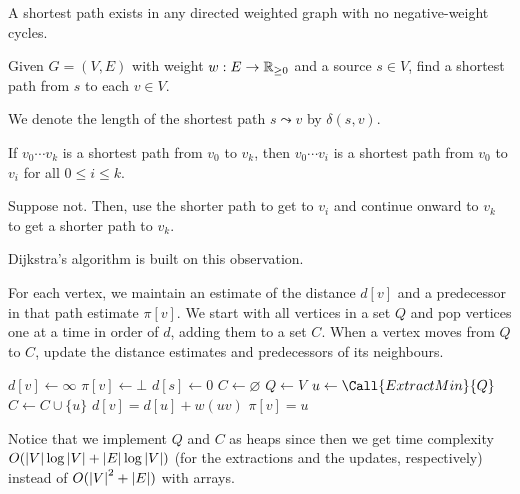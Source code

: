 \begin{remark}
  A shortest path exists in any directed weighted graph
  with no negative-weight cycles.
\end{remark}

\begin{problem}
  Given $G = (V, E)$ with weight $w : E \to \mathbb{R}_{\geq 0}$ and a source $s \in V$,
  find a shortest path from $s$ to each $v \in V$.
\end{problem}

We denote the length of the shortest path $s \leadsto v$ by $\delta(s,v)$.

\begin{remark}\label{rem:greedy:path}
  If $v_0\cdots v_k$ is a shortest path from $v_0$ to $v_k$,
  then $v_0\cdots v_i$ is a shortest path from $v_0$ to $v_i$
  for all $0 \leq i \leq k$.
\end{remark}
\begin{prf}
  Suppose not.
  Then, use the shorter path to get to $v_i$ and continue onward to $v_k$
  to get a shorter path to $v_k$.
\end{prf}

Dijkstra's algorithm is built on this observation.

For each vertex, we maintain an estimate of the distance $d[v]$
and a predecessor in that path estimate $\pi[v]$.
We start with all vertices in a set $Q$
and pop vertices one at a time in order of $d$,
adding them to a set $C$.
When a vertex moves from $Q$ to $C$,
update the distance estimates and predecessors of its neighbours.

\begin{algorithm}[H]
  \caption{}
  \begin{algorithmic}[1]
    \State $d[v] \gets \infty$
    \State $\pi[v] \gets \bot$
    \EndFor
    \State $d[s] \gets 0$
    \State $C \gets \varnothing$
    \State $Q \gets V$
    \State $u \gets \Call{ExtractMin}{Q}$
    \State $C \gets C \cup \{u\}$
    \State $d[v] = d[u] + w(uv)$
    \State $\pi[v] = u$
    \EndIf
    \EndFor
    \EndWhile
  \end{algorithmic}
\end{algorithm}

Notice that we implement $Q$ and $C$ as heaps since then
we get time complexity $O(\abs{V}\log\abs{V} + \abs{E}\log\abs{V})$
(for the extractions and the updates, respectively)
instead of $O(\abs{V}^2+\abs{E})$ with arrays.

